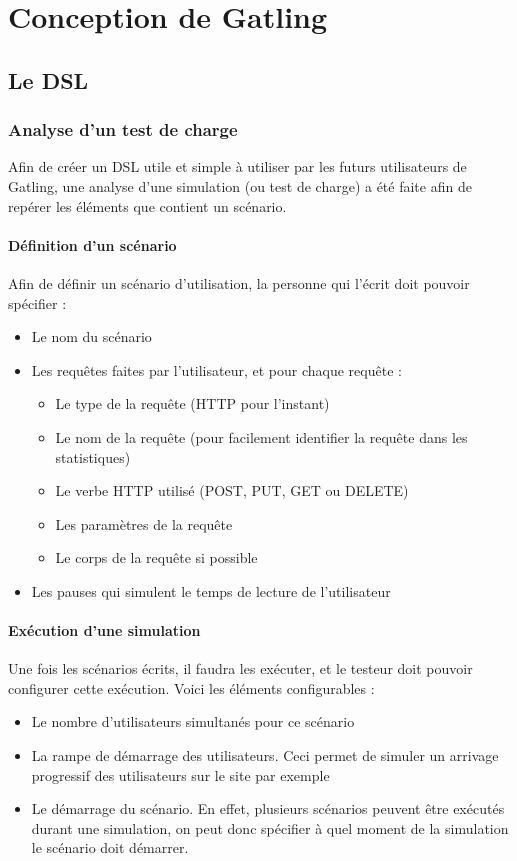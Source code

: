 \chapter{Conception de Gatling}
\section{Le DSL}
\subsection{Analyse d'un test de charge}
Afin de créer un DSL utile et simple à utiliser par les futurs utilisateurs de Gatling, une analyse d'une simulation (ou test de charge) a été faite afin de repérer les éléments que contient un scénario.

\subsubsection{Définition d'un scénario}
Afin de définir un scénario d'utilisation, la personne qui l'écrit doit pouvoir spécifier :
\begin{itemize}
  \item Le nom du scénario
  \item Les requêtes faites par l'utilisateur, et pour chaque requête :
  \begin{itemize}
    \item Le type de la requête (HTTP pour l'instant)
	\item Le nom de la requête (pour facilement identifier la requête dans les statistiques)
    \item Le verbe HTTP utilisé (POST, PUT, GET ou DELETE)
    \item Les paramètres de la requête
    \item Le corps de la requête si possible
  \end{itemize}
  \item Les pauses qui simulent le temps de lecture de l'utilisateur
\end{itemize}

\subsubsection{Exécution d'une simulation}
Une fois les scénarios écrits, il faudra les exécuter, et le testeur doit pouvoir configurer cette exécution. Voici les éléments configurables :
\begin{itemize}
  \item Le nombre d'utilisateurs simultanés pour ce scénario
  \item La rampe de démarrage des utilisateurs. Ceci permet de simuler un arrivage progressif des utilisateurs sur le site par exemple
  \item Le démarrage du scénario. En effet, plusieurs scénarios peuvent être exécutés durant une simulation, on peut donc spécifier à quel moment de la simulation le scénario doit démarrer.
\end{itemize}

